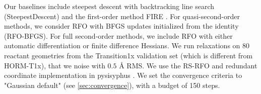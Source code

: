 \documentclass[pdflatex,sn-mathphys-num]{sn-jnl}%
\theoremstyle{thmstyleone}%
\theoremstyle{thmstyletwo}%
\theoremstyle{thmstylethree}%
\begin{document}
\begin{appendices}
Our baselines include steepest descent with backtracking line search (SteepestDescent) and the first-order method FIRE \citep{bitzek2006}. For quasi-second-order methods, we consider RFO with BFGS updates initialized from the identity (RFO-BFGS). For full second-order methods, we include RFO with either automatic differentiation or finite difference Hessians. 
%
We run relaxations on 80 reactant geometries from the Transition1x validation set (which is different from HORM-T1x), that we noise with $0.5$ \AA{} RMS. We use the RS-RFO and redundant coordinate implementation in pysisyphus \citep{steinmetzer2021, herbolComputationalImplementationNudged2017}. We set the convergence criteria to "Gaussian default" (see \ref{sec:convergence}), with a budget of 150 steps.


\end{appendices}
\end{document}

